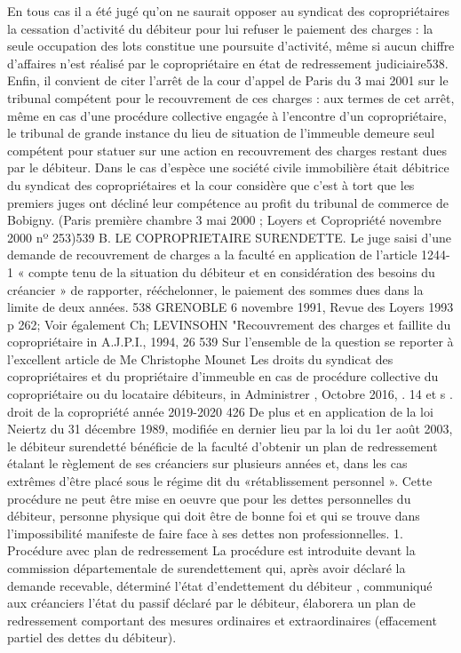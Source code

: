 En tous cas il a été jugé qu’on ne saurait opposer au syndicat des copropriétaires la cessation d'activité du débiteur pour lui refuser le paiement des charges : la seule occupation des lots constitue une poursuite d'activité, même si aucun chiffre d'affaires n'est réalisé par le copropriétaire en état de redressement judiciaire538.
Enfin, il convient de citer l'arrêt de la cour d'appel de Paris du 3 mai 2001 sur le tribunal compétent pour le recouvrement de ces charges : aux termes de cet arrêt, même en cas d'une procédure collective engagée à l'encontre d'un copropriétaire, le tribunal de grande instance du lieu de situation de l'immeuble demeure seul compétent pour statuer sur une action en recouvrement des charges restant dues par le débiteur. Dans le cas d'espèce une société civile immobilière était débitrice du syndicat des copropriétaires et la cour considère que c'est à tort que les premiers juges ont décliné leur compétence au profit du tribunal de commerce de Bobigny. (Paris première chambre 3 mai 2000 ; Loyers et Copropriété novembre 2000 nº 253)539
B. LE COPROPRIETAIRE SURENDETTE.
Le juge saisi d’une demande de recouvrement de charges a la faculté en application de l’article 1244-1 « compte tenu de la situation du débiteur et en considération des besoins du créancier » de rapporter, rééchelonner, le paiement des sommes dues dans la limite de deux années.
538 GRENOBLE 6 novembre 1991, Revue des Loyers 1993 p 262; Voir également Ch; LEVINSOHN "Recouvrement des charges et faillite du copropriétaire in A.J.P.I., 1994, 26
539 Sur l’ensemble de la question se reporter à l’excellent article de Me Christophe Mounet Les droits du syndicat des copropriétaires et du propriétaire d’immeuble en cas de procédure collective du copropriétaire ou du locataire débiteurs, in Administrer , Octobre 2016, . 14 et s .
droit de la copropriété année 2019-2020
426
De plus et en application de la loi Neiertz du 31 décembre 1989, modifiée en dernier lieu par la loi du 1er août 2003, le débiteur surendetté bénéficie de la faculté d’obtenir un plan de redressement étalant le règlement de ses créanciers sur plusieurs années et, dans les cas extrêmes d’être placé sous le régime dit du «rétablissement personnel ».
Cette procédure ne peut être mise en oeuvre que pour les dettes personnelles du débiteur, personne physique qui doit être de bonne foi et qui se trouve dans l'impossibilité manifeste de faire face à ses dettes non professionnelles.
1. Procédure avec plan de redressement
La procédure est introduite devant la commission départementale de surendettement qui, après avoir déclaré la demande recevable, déterminé l'état d'endettement du débiteur , communiqué aux créanciers l'état du passif déclaré par le débiteur, élaborera un plan de redressement comportant des mesures ordinaires et extraordinaires (effacement partiel des dettes du débiteur).
